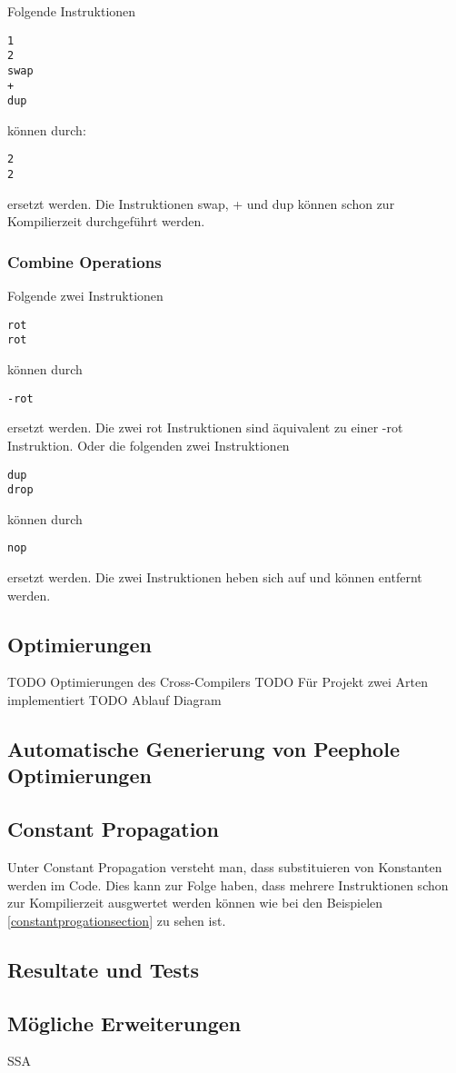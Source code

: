 Folgende Instruktionen
%
\begin{verbatim}
1
2
swap
+
dup
\end{verbatim}
%
können durch:
%
\begin{verbatim}
2
2
\end{verbatim}
%
ersetzt werden. Die Instruktionen swap, + und dup können schon zur Kompilierzeit durchgeführt werden.
\subsubsection{Combine Operations}
Folgende zwei Instruktionen
%
\begin{verbatim}
rot
rot
\end{verbatim}
%
können durch
%
\begin{verbatim}
-rot
\end{verbatim}
%
ersetzt werden. Die zwei rot Instruktionen sind äquivalent zu einer -rot Instruktion. Oder die folgenden zwei Instruktionen
%
\begin{verbatim}
dup
drop
\end{verbatim}
%
können durch
%
\begin{verbatim}
nop
\end{verbatim}
%
ersetzt werden. Die zwei Instruktionen heben sich auf und können entfernt werden.

\newpage

\subsection{Optimierungen}

TODO Optimierungen des Cross-Compilers
TODO Für Projekt zwei Arten implementiert
TODO Ablauf Diagram

\subsection{Automatische Generierung von Peephole Optimierungen}

\subsection{Constant Propagation}
Unter Constant Propagation versteht man, dass substituieren von Konstanten werden im Code. Dies kann zur Folge haben, dass mehrere Instruktionen schon zur Kompilierzeit ausgwertet werden können wie bei den Beispielen \ref{constantprogationsection} zu sehen ist.

\subsection{Resultate und Tests}


\subsection{Mögliche Erweiterungen}
SSA
